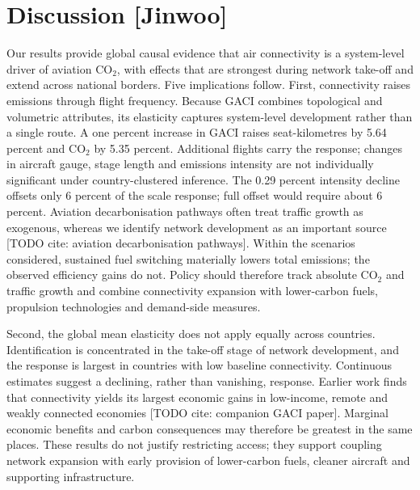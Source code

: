 \documentclass[12pt]{extarticle}
\begin{document}
\section*{Discussion [Jinwoo]}
Our results provide global causal evidence that air connectivity is a system-level driver of aviation CO$_2$, with effects that are strongest during network take-off and extend across national borders. Five implications follow. First, connectivity raises emissions through flight frequency. Because GACI combines topological and volumetric attributes, its elasticity captures system-level development rather than a single route. A one percent increase in GACI raises seat-kilometres by 5.64 percent and CO$_2$ by 5.35 percent. Additional flights carry the response; changes in aircraft gauge, stage length and emissions intensity are not individually significant under country-clustered inference. The 0.29 percent intensity decline offsets only 6 percent of the scale response; full offset would require about 6 percent. Aviation decarbonisation pathways often treat traffic growth as exogenous, whereas we identify network development as an important source [TODO cite: aviation decarbonisation pathways]. Within the scenarios considered, sustained fuel switching materially lowers total emissions; the observed efficiency gains do not. Policy should therefore track absolute CO$_2$ and traffic growth and combine connectivity expansion with lower-carbon fuels, propulsion technologies and demand-side measures.

Second, the global mean elasticity does not apply equally across countries. Identification is concentrated in the take-off stage of network development, and the response is largest in countries with low baseline connectivity. Continuous estimates suggest a declining, rather than vanishing, response. Earlier work finds that connectivity yields its largest economic gains in low-income, remote and weakly connected economies [TODO cite: companion GACI paper]. Marginal economic benefits and carbon consequences may therefore be greatest in the same places. These results do not justify restricting access; they support coupling network expansion with early provision of lower-carbon fuels, cleaner aircraft and supporting infrastructure.
\end{document}
